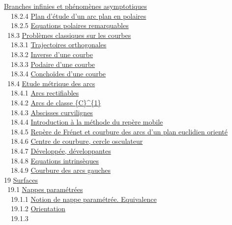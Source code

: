 \documentclass[]{article}
\begin{document}
\href{coursse97.html\#x118-54800018.2.3}{Branches infinies et phénomènes
asymptotiques} \\ ~~18.2.4 \href{coursse97.html\#x118-54900018.2.4}{Plan
d'étude d'un arc plan en polaires} \\ ~~18.2.5
\href{coursse97.html\#x118-55000018.2.5}{Equations polaires
remarquables} \\ ~18.3 \href{coursse98.html\#x119-55100018.3}{Problèmes
classiques sur les courbes} \\ ~~18.3.1
\href{coursse98.html\#x119-55200018.3.1}{Trajectoires orthogonales} \\
~~18.3.2 \href{coursse98.html\#x119-55300018.3.2}{Inverse d'une courbe}
\\ ~~18.3.3 \href{coursse98.html\#x119-55400018.3.3}{Podaire d'une
courbe} \\ ~~18.3.4 \href{coursse98.html\#x119-55500018.3.4}{Conchoïdes
d'une courbe} \\ ~18.4 \href{coursse99.html\#x120-55600018.4}{Etude
métrique des arcs} \\ ~~18.4.1
\href{coursse99.html\#x120-55700018.4.1}{Arcs rectifiables} \\ ~~18.4.2
\href{coursse99.html\#x120-55800018.4.2}{Arcs de classe \{C\}\^{}\{1\}}
\\ ~~18.4.3 \href{coursse99.html\#x120-55900018.4.3}{Abscisses
curvilignes} \\ ~~18.4.4
\href{coursse99.html\#x120-56000018.4.4}{Introduction à la méthode du
repère mobile} \\ ~~18.4.5
\href{coursse99.html\#x120-56100018.4.5}{Repère de Frénet et courbure
des arcs d'un plan euclidien orienté} \\ ~~18.4.6
\href{coursse99.html\#x120-56200018.4.6}{Centre de courbure, cercle
osculateur} \\ ~~18.4.7
\href{coursse99.html\#x120-56300018.4.7}{Développée, développantes} \\
~~18.4.8 \href{coursse99.html\#x120-56400018.4.8}{Equations
intrinsèques} \\ ~~18.4.9
\href{coursse99.html\#x120-56500018.4.9}{Courbure des arcs gauches} \\
19 \href{coursch20.html\#x121-56600019}{Surfaces} \\ ~19.1
\href{coursse100.html\#x122-56700019.1}{Nappes paramétrées} \\ ~~19.1.1
\href{coursse100.html\#x122-56800019.1.1}{Notion de nappe paramétrée.
Equivalence} \\ ~~19.1.2
\href{coursse100.html\#x122-56900019.1.2}{Orientation} \\ ~~19.1.3
\end{document}
